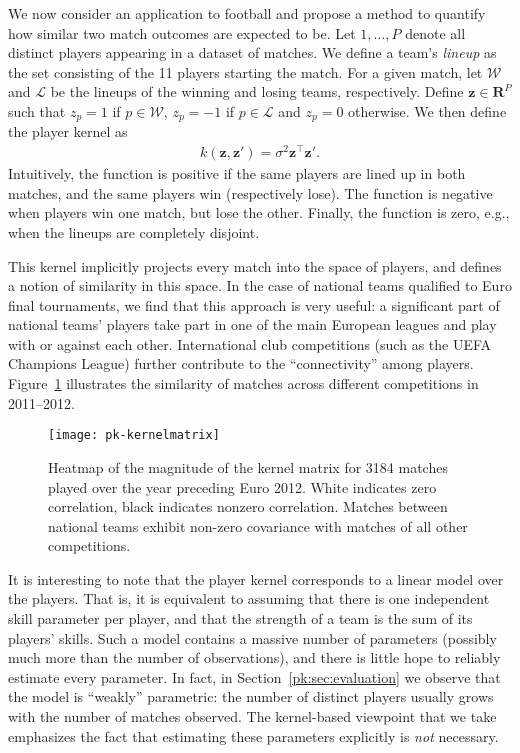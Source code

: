 We now consider an application to football and propose a method to quantify how similar two match outcomes are expected to be.
Let $1, \dots, P$ denote all distinct players appearing in a dataset of matches.
We define a team's \emph{lineup} as the set consisting of the \num{11} players starting the match.
For a given match, let $\mathcal{W}$ and $\mathcal{L}$ be the lineups of the winning and losing teams, respectively.
Define $\bm{z} \in \mathbf{R}^P$ such that $z_p = 1$ if $p \in \mathcal{W}$, $z_p = -1$ if $p \in \mathcal{L}$ and $z_p = 0$ otherwise.
We then define the player kernel as
\begin{align*}
k(\bm{z}, \bm{z}') = \sigma^2 \bm{z}^\top \bm{z}'.
\end{align*}
Intuitively, the function is positive if the same players are lined up in both matches, and the same players win (respectively lose).
The function is negative when players win one match, but lose the other.
Finally, the function is zero, e.g., when the lineups are completely disjoint.

This kernel implicitly projects every match into the space of players, and defines a notion of similarity in this space.
In the case of national teams qualified to Euro final tournaments, we find that this approach is very useful: a significant part of national teams' players take part in one of the main European leagues and play with or against each other.
International club competitions (such as the UEFA Champions League) further contribute to the ``connectivity'' among players.
Figure~\ref{pk:fig:kernel} illustrates the similarity of matches across different competitions in 2011--2012.


\begin{figure}
  \centering
  \texttt{[image: pk-kernelmatrix]}
  \caption{Heatmap of the magnitude of the kernel matrix for \num{3184} matches played over the year preceding Euro 2012.
White indicates zero correlation, black indicates nonzero correlation.
Matches between national teams exhibit non-zero covariance with matches of all other competitions.
}
  \label{pk:fig:kernel}
\end{figure}

It is interesting to note that the player kernel corresponds to a linear model over the players.
That is, it is equivalent to assuming that there is one independent skill parameter per player, and that the strength of a team is the sum of its players' skills.
Such a model contains a massive number of parameters (possibly much more than the number of observations), and there is little hope to reliably estimate every parameter.
In fact, in Section~\ref{pk:sec:evaluation} we observe that the model is ``weakly'' parametric: the number of distinct players usually grows with the number of matches observed.
The kernel-based viewpoint that we take emphasizes the fact that estimating these parameters explicitly is \emph{not} necessary.


